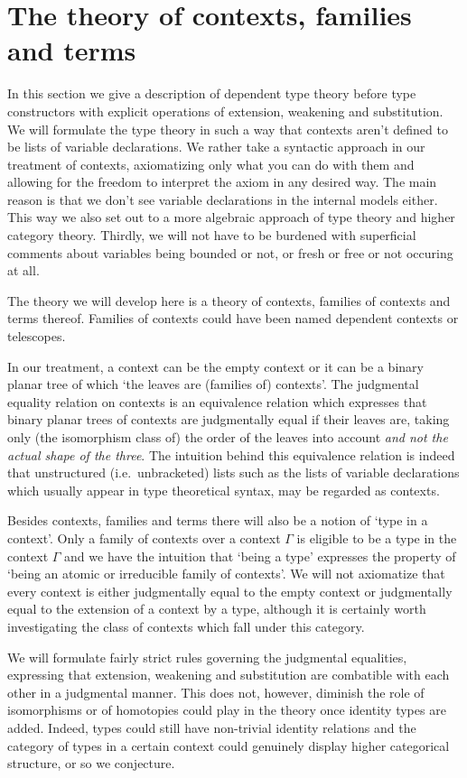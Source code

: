 \section{The theory of contexts, families and terms}\label{tt}
In this section we give a description of dependent type theory before type
constructors with explicit operations of extension, weakening and substitution. We will
formulate the type theory in such a way that contexts aren't defined
to be lists of variable
declarations. We rather take a syntactic approach in our treatment of contexts,
axiomatizing only what you can do with them and allowing for the freedom to
interpret the axiom in any desired way. 
The main reason is that we don't see variable declarations in the internal
models either. This way we also set out to a more algebraic approach of type
theory and higher category theory. Thirdly, we will not have to be burdened with
superficial comments about variables being bounded or not, or fresh or free or 
not occuring at all.

The theory we will develop here is a theory of contexts, families of contexts
and terms thereof. Families of contexts could have been named dependent contexts
or telescopes.

In our treatment, a context can be the empty context or it can be a binary
planar tree of which `the leaves are (families of) contexts'. 
The judgmental equality relation on contexts is an equivalence relation which 
expresses that binary planar
trees of contexts are judgmentally equal if their leaves are, taking only
(the isomorphism class of) 
the order of the leaves into account \emph{and not the actual shape of the three}.
The intuition behind this equivalence relation is indeed that unstructured
(i.e.~unbracketed) lists such as the lists of variable declarations which
usually appear in type theoretical syntax, may be regarded as contexts.

Besides contexts, families and terms there will also be a notion of `type in
a context'. Only a family of contexts over a context $\Gamma$ is eligible to
be a type in the context $\Gamma$ and we have the intuition that `being a type'
expresses the property of `being an atomic or irreducible family of contexts'.
We will not axiomatize that every context is either judgmentally equal to the
empty context or judgmentally equal to the extension of a context by a type,
although it is certainly worth investigating the class of contexts which fall
under this category.

We will formulate fairly strict rules governing the judgmental equalities,
expressing that extension, weakening and substitution are combatible with
each other in a judgmental manner. This does not, however, diminish the role
of isomorphisms or of homotopies could play in the theory once identity types
are added. Indeed, types could still have non-trivial identity relations and
the category of types in a certain context could genuinely display higher
categorical structure, or so we conjecture.

